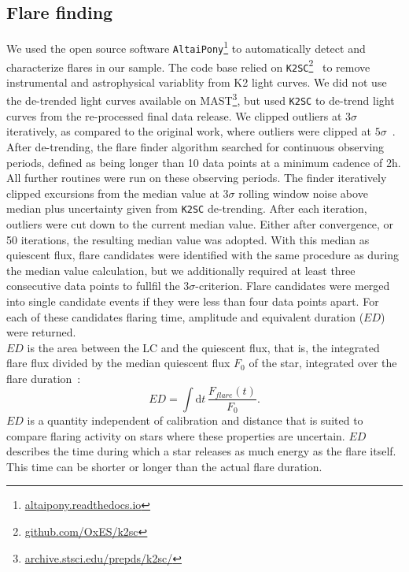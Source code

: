 \documentclass{aa}
\begin{document}
\subsection{Flare finding}
We used the open source software \texttt{AltaiPony}\footnote{\url{altaipony.readthedocs.io}} to automatically detect and characterize flares in our sample. The code base relied on \texttt{K2SC}\footnote{\url{github.com/OxES/k2sc}}~\citep{aigrain_k2sc_2016} to remove instrumental and astrophysical variablity from K2 light curves. We did not use the de-trended light curves available on MAST\footnote{\url{archive.stsci.edu/prepds/k2sc/}}, but used \texttt{K2SC} to de-trend light curves from the re-processed final data release. We clipped outliers at $3\sigma$ iteratively, as compared to the original work, where outliers were clipped at $5\sigma$~\citep{aigrain_k2sc_2016}.
\\
After de-trending, the flare finder algorithm searched for continuous observing periods, defined as being longer than 10 data points at a minimum cadence of 2\;h. All further routines were run on these observing periods. The finder iteratively clipped excursions from the median value at $3\sigma$ rolling window noise above median plus uncertainty given from \texttt{K2SC} de-trending. After each iteration, outliers were cut down to the current median value. Either after convergence, or 50 iterations, the resulting median value was adopted. With this median as quiescent flux, flare candidates were identified with the same procedure as during the median value calculation, but we additionally required at least three consecutive data points to fullfil the $3\sigma$-criterion. Flare candidates were merged into single candidate events if they were less than four data points apart. For each of these candidates flaring time, amplitude and equivalent duration ($ED$) were returned.
\\
$ED$ is the area between the LC and the quiescent flux, that is, the integrated flare flux divided by the median quiescent flux $F_0$ of the star, integrated over the flare duration~\citep{gershberg1972}:
\begin{equation}
\label{05_ED}
ED=\displaystyle \int \mathrm dt\, \frac{F_{flare}(t)}{F_0}.
\end{equation}
$ED$ is a quantity independent of calibration and distance that is suited to compare flaring activity on stars where these properties are uncertain. $ED$ describes the time during which a star releases as much energy as the flare itself. This time can be shorter or longer than the actual flare duration. 
\end{document}
